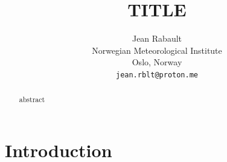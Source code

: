\documentclass{article}
\title{TITLE}
\author{
  Jean Rabault \\
  Norwegian Meteorological Institute \\
  Oslo, Norway \\
  \texttt{jean.rblt@proton.me} \\
  \And
}
\begin{document}
\maketitle

\begin{abstract}
abstract
\end{abstract}

\section{Introduction}





\end{document}
